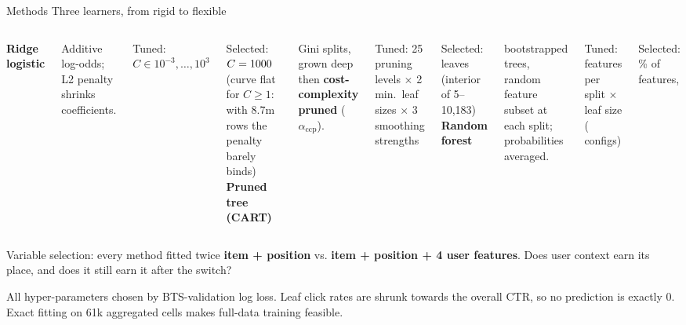 \documentclass[aspectratio=169,10pt]{beamer}
\newcommand{\aside}[1]{{\footnotesize\color{muted}#1}}
\begin{document}
\begin{frame}{Methods \textperiodcentered{} Three learners, from rigid to flexible}
\vspace{.1cm}
\begin{columns}[T,onlytextwidth]
{\large\color{teal}\bfseries Ridge logistic}\par\vspace{.1cm}
\small Additive log-odds; L2 penalty shrinks coefficients.\par\vspace{.15cm}
\aside{Tuned:} \(C \in 10^{-3},\dots,10^{3}\)\par
\aside{Selected:} \(C=1000\) \aside{(curve flat for \(C\ge 1\): with 8.7m rows the penalty barely binds)}
{\large\color{amber}\bfseries Pruned tree (CART)}\par\vspace{.1cm}
\small Gini splits, grown deep then \textbf{cost-complexity pruned} (\(\alpha_{\mathrm{ccp}}\)).\par\vspace{.15cm}
\aside{Tuned:} 25 pruning levels \(\times\) 2 min.\ leaf sizes \(\times\) 3 smoothing strengths\par
\aside{Selected:} \cartLeaves{} leaves \aside{(interior of 5--10{,}183)}
{\large\color{plum}\bfseries Random forest}\par\vspace{.1cm}
\small \forestB{} bootstrapped trees, random feature subset at each split; probabilities averaged.\par\vspace{.15cm}
\aside{Tuned:} features per split \(\times\) leaf size (\forestGrid{} configs)\par
\aside{Selected:} \forestMf\% of features, \forestLeafText
\end{columns}
\vspace{.15cm}
\begin{block}{Variable selection: every method fitted twice}
\textbf{item + position} \quad vs. \quad \textbf{item + position + 4 user features}. Does user context earn its place, and does it still earn it after the switch?
\end{block}
\vspace{.1cm}
\aside{All hyper-parameters chosen by BTS-validation log loss. Leaf click rates are shrunk towards the overall CTR, so no prediction is exactly 0. Exact fitting on 61k aggregated cells makes full-data training feasible.}
\end{frame}
\end{document}
